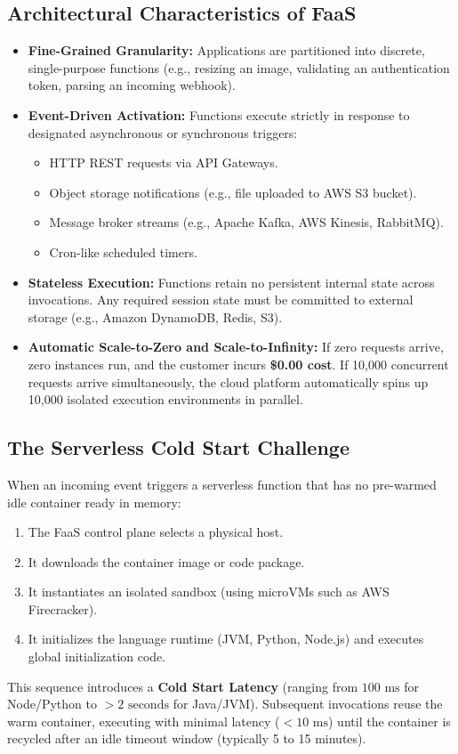 \subsection{Architectural Characteristics of FaaS}
\begin{itemize}[leftmargin=*]
  \item \textbf{Fine-Grained Granularity:} Applications are partitioned into discrete, single-purpose functions (e.g., resizing an image, validating an authentication token, parsing an incoming webhook).
  \item \textbf{Event-Driven Activation:} Functions execute strictly in response to designated asynchronous or synchronous triggers:
    \begin{itemize}
      \item HTTP REST requests via API Gateways.
      \item Object storage notifications (e.g., file uploaded to AWS S3 bucket).
      \item Message broker streams (e.g., Apache Kafka, AWS Kinesis, RabbitMQ).
      \item Cron-like scheduled timers.
    \end{itemize}
  \item \textbf{Stateless Execution:} Functions retain no persistent internal state across invocations. Any required session state must be committed to external storage (e.g., Amazon DynamoDB, Redis, S3).
  \item \textbf{Automatic Scale-to-Zero and Scale-to-Infinity:} If zero requests arrive, zero instances run, and the customer incurs \textbf{\$0.00 cost}. If 10,000 concurrent requests arrive simultaneously, the cloud platform automatically spins up 10,000 isolated execution environments in parallel.
\end{itemize}

\subsection{The Serverless Cold Start Challenge}
When an incoming event triggers a serverless function that has no pre-warmed idle container ready in memory:
\begin{enumerate}[leftmargin=*]
  \item The FaaS control plane selects a physical host.
  \item It downloads the container image or code package.
  \item It instantiates an isolated sandbox (using microVMs such as AWS Firecracker).
  \item It initializes the language runtime (JVM, Python, Node.js) and executes global initialization code.
\end{enumerate}
This sequence introduces a \textbf{Cold Start Latency} (ranging from $100\text{ ms}$ for Node/Python to $>2\text{ seconds}$ for Java/JVM). Subsequent invocations reuse the warm container, executing with minimal latency ($< 10\text{ ms}$) until the container is recycled after an idle timeout window (typically 5 to 15 minutes).

